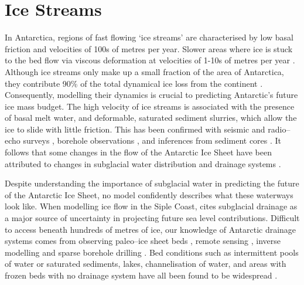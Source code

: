 


\section{Ice Streams} \label{sec:ice_streams}

In Antarctica, regions of fast flowing `ice streams'  are characterised by low basal friction and velocities of 100s of metres per year. Slower areas where ice is stuck to the bed flow via viscous deformation at velocities of 1-10s of metres per year \citep{rignot2011ice, morlighem2013inversion}.
Although ice streams only make up a small fraction of the area of  Antarctica, they contribute 90\% of the total dynamical ice loss from the continent \citep{bamber2000widespread, rignot2011ice}.  Consequently, modelling their dynamics is crucial to predicting Antarctic's future ice mass budget. The high velocity of ice streams is associated with the presence of basal melt water, and deformable, saturated sediment slurries, which allow the ice to slide with little friction. This has been confirmed with seismic \citep{blankenship1986seismic, alley1987till} and radio--echo surveys \citep{robin1970radio}, borehole observations  \citep{engelhardt1997basal}, and inferences from sediment cores \citep{hodson2016physical}.
It follows that some changes in the flow of the Antarctic Ice Sheet have been attributed to changes in subglacial water distribution and drainage systems \citep[e.g.][]{alley1994water}.

Despite understanding the importance of subglacial water in predicting the future of the Antarctic Ice Sheet, no model confidently describes what these waterways look like. When modelling ice flow in the Siple Coast, \cite{bougamont2015reactivation} cites subglacial drainage as a major source of uncertainty in projecting future sea level contributions.
Difficult to access beneath hundreds of metres of ice, our  knowledge of Antarctic drainage systems comes from observing paleo--ice sheet beds \citep{hattestrand1997ribbed, lewis2006age}, remote sensing \citep{schroeder2013evidence}, inverse modelling \citep{morlighem2013inversion} and sparse borehole drilling \citep{engelhardt1997basal}.
Bed conditions such as intermittent pools of water or saturated
sediments, lakes, channelisation of water, and areas with frozen beds with no drainage system have all been found to be widespread \citep{carter2009using, schroeder2013evidence, young2016distribution}. 

